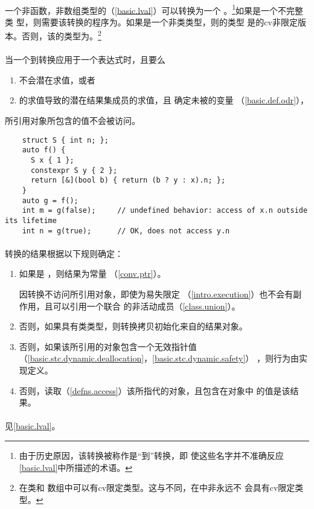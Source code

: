 \paragraph{} %
一个非函数，非数组类型的\glvalue{}（\ref{basic.lval}）可以转换为一个
\prvalue{}。\footnote{由于历史原因，该转换被称作是“\lvalue{}到\rvalue{}”转换，即
使这些名字并不准确反应\ref{basic.lval}中所描述的术语。}如果是一个不完整类
型，则需要该转换的程序为\illform{}。如果是一个非类类型，则\prvalue{}的类型
是的cv非限定版本。否则，该\prvalue{}的类型为。\footnote{在\cpp{}类和
数组\prvalue{}中可以有cv限定类型。这与\isoc{}不同，在\isoc{}中非\lvalue{}永远不
会具有cv限定类型。}

\paragraph{} %
当一个\lvalue{}到\rvalue{}转换应用于一个表达式时，且要么
\begin{enumerate}
  \item {}不会潜在求值，或者
  \item {}的求值导致的潜在结果集成员的求值，且
        确定未被\odruse{}的变量
        （\ref{basic.def.odr}），
\end{enumerate}
所引用对象所包含的值不会被访问。

\begin{example}
  \begin{lstlisting}
    struct S { int n; };
    auto f() {
      S x { 1 };
      constexpr S y { 2 };
      return [&](bool b) { return (b ? y : x).n; };
    }
    auto g = f();
    int m = g(false);     // undefined behavior: access of x.n outside its lifetime
    int n = g(true);      // OK, does not access y.n
  \end{lstlisting}
\end{example}

\paragraph{} %
转换的结果根据以下规则确定：
\begin{enumerate}
  \item 如果是 ，则结果为\nullp{}常量
        （\ref{conv.ptr}）。

        \begin{note}
          因转换不访问\glvalue{}所引用对象，即使为易失限定
          （\ref{intro.execution}）也不会有副作用，且\glvalue{}可以引用一个联合
          的非活动成员（\ref{class.union}）。
        \end{note}
  \item 否则，如果具有类类型，则转换拷贝初始化来自\glvalue{}的结果对象。
  \item 否则，如果该\glvalue{}所引用的对象包含一个无效指针值
        （\ref{basic.stc.dynamic.deallocation}，\ref{basic.stc.dynamic.safety}）
        ，则行为由实现定义。
  \item 否则，读取（\ref{defns.access}）该\glvalue{}所指代的对象，且包含在对象中
        的值是该\prvalue{}结果。
\end{enumerate}

\paragraph{} %
\begin{note}
  见\ref{basic.lval}。
\end{note}
